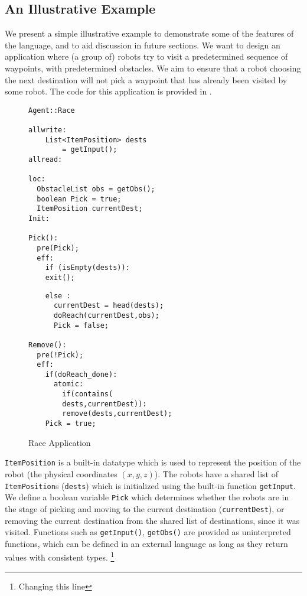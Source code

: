  \subsection[h]{An Illustrative Example}
\label{sect:Eg}
We present a simple illustrative example to demonstrate some of the features of the language, and to aid discussion in future sections. We want to design an application where (a group of) robots try to visit a predetermined sequence of waypoints, with predetermined obstacles. We aim to ensure that a robot choosing the next destination will not pick a waypoint that has already been visited by some robot. The code for this application is provided in .

\begin{figure}[ht!]
\label{fig:Race}
\noindent\begin{minipage}{.5\textwidth}

\begin{lstlisting}
Agent::Race

allwrite:
	List<ItemPosition> dests 
    	= getInput();
allread:

loc:
  ObstacleList obs = getObs();
  boolean Pick = true; 
  ItemPosition currentDest;
Init:

Pick():
  pre(Pick);
  eff:
    if (isEmpty(dests)):
    exit();   
 \end{lstlisting}
 \end{minipage}\hfill
\noindent\begin{minipage}{.5\textwidth}

\begin{lstlisting}
    else :
      currentDest = head(dests);
      doReach(currentDest,obs);
      Pick = false;
      
Remove():
  pre(!Pick);
  eff:
    if(doReach_done):
      atomic:
        if(contains(
        dests,currentDest)):
        remove(dests,currentDest);
    Pick = true;
 \end{lstlisting}
 \end{minipage}\hfill
 \caption{Race Application}
 \end{figure}
\verb|ItemPosition| is a built-in datatype which is used to represent the position of the robot (the physical coordinates $(x,y,z)$). The robots have a shared list of \verb|ItemPosition|s (\verb|dests|) which is initialized using the built-in function \verb|getInput|. We define a boolean variable \verb|Pick| which determines whether the robots are in the stage of picking and moving to the current destination (\verb|currentDest|), or removing the current destination from the shared list of destinations, since it was visited. Functions such as \verb|getInput()|, \verb|getObs()| are provided as uninterpreted functions, which can be defined in an external language as long as they return values with consistent types. \footnote{Changing this line}

